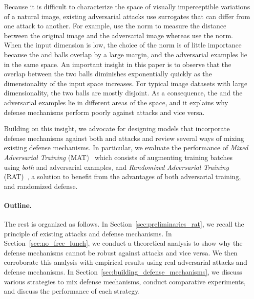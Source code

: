 Because it is difficult to characterize the space of visually imperceptible variations of a natural image, existing adversarial attacks use surrogates that can differ from one attack to another. For example, \cite{goodfellow2014explaining} use the \linf norm to measure the distance between the original image and the adversarial image whereas \cite{carlini2017towards} use the \ltwo norm.  When the input dimension is low, the choice of the norm is of little importance because the \linf and \ltwo balls overlap by a large margin, and the adversarial examples lie in the same space. An important insight in this paper is to observe that the overlap between the two balls  diminishes exponentially quickly as the dimensionality of the input space increases. For typical image datasets with large dimensionality, the two balls are mostly disjoint. As a consequence, the \linf and the \ltwo adversarial examples lie in different areas of the space, and it explains why \linf defense mechanisms perform poorly against \ltwo attacks and vice versa. 

Building on this insight, we advocate for designing models that incorporate defense mechanisms against both \linf and \ltwo attacks and review several ways of mixing existing defense mechanisms. In particular, we evaluate the performance of  {\em Mixed Adversarial Training} (MAT)~\cite{goodfellow2014explaining} which consists of  augmenting training batches using \emph{both} \linf and \ltwo adversarial examples, and {\em Randomized Adversarial Training} (RAT)~\cite{salman2019provably}, a solution to benefit from the advantages of both \linf adversarial training, and \ltwo randomized defense. 


\paragraph{Outline.} The rest is organized as follows. In Section~\ref{sec:preliminaries_rat}, we recall the principle of existing attacks and defense mechanisms. In Section~\ref{sec:no_free_lunch}, we conduct a theoretical analysis to show why  the \linf defense mechanisms cannot be robust against \ltwo attacks and vice versa. We then corroborate this analysis with empirical results using real adversarial attacks and defense mechanisms. In Section~\ref{sec:building_defense_mechanisms}, we discuss various strategies to mix defense mechanisms, conduct comparative experiments, and discuss the performance of each strategy. 



